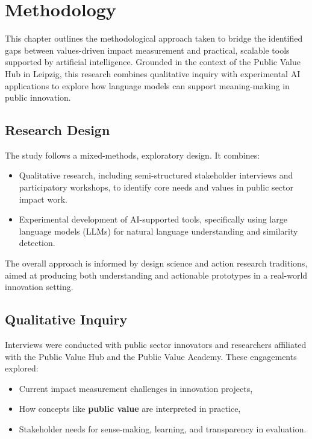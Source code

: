 \chapter{Methodology}\label{ch:methodology}

This chapter outlines the methodological approach taken to bridge the identified gaps between values-driven impact measurement and practical, scalable tools supported by artificial intelligence.
Grounded in the context of the Public Value Hub in Leipzig, this research combines qualitative inquiry with experimental AI applications to explore how language models can support meaning-making in public innovation.

\section{Research Design}\label{sec:research-design}

The study follows a mixed-methods, exploratory design.
It combines:
\begin{itemize}
    \item Qualitative research, including semi-structured stakeholder interviews and participatory workshops, to identify core needs and values in public sector impact work.
    \item Experimental development of AI-supported tools, specifically using large language models (LLMs) for natural language understanding and similarity detection.
\end{itemize}

The overall approach is informed by design science and action research traditions, aimed at producing both understanding and actionable prototypes in a real-world innovation setting.

\section{Qualitative Inquiry}\label{sec:qualitative-inquiry}

Interviews were conducted with public sector innovators and researchers affiliated with the Public Value Hub and the Public Value Academy.
These engagements explored:

\begin{itemize}
    \item Current impact measurement challenges in innovation projects,
    \item How concepts like \textbf{public value} are interpreted in practice,
    \item Stakeholder needs for sense-making, learning, and transparency in evaluation.
\end{itemize}

